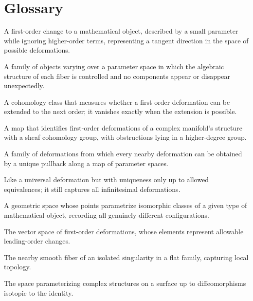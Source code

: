 \section*{Glossary}
\begin{description}[leftmargin=*,style=nextline,itemsep=0.3em]
\item[\textbf{Infinitesimal deformation.}] A first-order change to a mathematical object, described by a small parameter while ignoring higher-order terms, representing a tangent direction in the space of possible deformations.
\item[\textbf{Flat family.}] A family of objects varying over a parameter space in which the algebraic structure of each fiber is controlled and no components appear or disappear unexpectedly.
\item[\textbf{Obstruction class.}] A cohomology class that measures whether a first-order deformation can be extended to the next order; it vanishes exactly when the extension is possible.
\item[\textbf{Kodaira--Spencer map.}] A map that identifies first-order deformations of a complex manifold's structure with a sheaf cohomology group, with obstructions lying in a higher-degree group.
\item[\textbf{Universal deformation.}] A family of deformations from which every nearby deformation can be obtained by a unique pullback along a map of parameter spaces.
\item[\textbf{Versal deformation.}] Like a universal deformation but with uniqueness only up to allowed equivalences; it still captures all infinitesimal deformations.
\item[\textbf{Moduli space.}] A geometric space whose points parametrize isomorphic classes of a given type of mathematical object, recording all genuinely different configurations.
\item[\textbf{Tangent space.}] The vector space of first-order deformations, whose elements represent allowable leading-order changes.
\item[\textbf{Milnor fiber.}] The nearby smooth fiber of an isolated singularity in a flat family, capturing local topology.
\item[\textbf{Teichmuller space.}] The space parameterizing complex structures on a surface up to diffeomorphisms isotopic to the identity.
\end{description}

